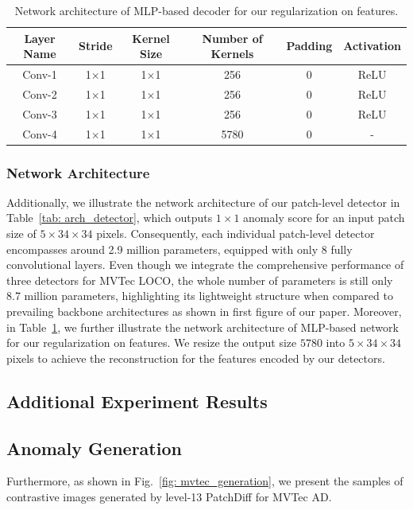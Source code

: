\begin{table}[!htpb]
\centering
\footnotesize
\begin{tabular}{cccccc}
\toprule
Layer Name & Stride & Kernel Size & Number of Kernels & Padding & Activation \\
\midrule
Conv-1 & 1$\times$1 & 1$\times$1 & 256 & 0 & ReLU \\
Conv-2 & 1$\times$1 & 1$\times$1 & 256 & 0 & ReLU \\
Conv-3 & 1$\times$1 & 1$\times$1 & 256 & 0 & ReLU \\
Conv-4 & 1$\times$1 & 1$\times$1 & 5780 & 0 & - \\
\bottomrule
\end{tabular}
\caption{Network architecture of MLP-based decoder for our regularization on features.}
\label{tab: arch_decoder}
\end{table}

\subsubsection{Network Architecture} Additionally, we illustrate the network architecture of our patch-level detector in Table~\ref{tab: arch_detector}, which outputs $1\times1$ anomaly score for an input patch size of $5\times34\times34$ pixels. Consequently, each individual patch-level detector encompasses around 2.9 million parameters, equipped with only 8 fully convolutional layers. Even though we integrate the comprehensive performance of three detectors for MVTec LOCO, the whole number of parameters is still only 8.7 million parameters, highlighting its lightweight structure when compared to prevailing backbone architectures as shown in first figure of our paper. Moreover, in Table~\ref{tab: arch_decoder}, we further illustrate the network architecture of MLP-based network for our regularization on features. We resize the output size $5780$ into $5\times34\times34$ pixels to achieve the reconstruction for the features encoded by our detectors. 

\subsection{Additional Experiment Results}
\subsection{Anomaly Generation}
Furthermore, as shown in Fig.~\ref{fig: mvtec_generation}, we present the samples of contrastive images generated by level-13 PatchDiff for MVTec AD.

